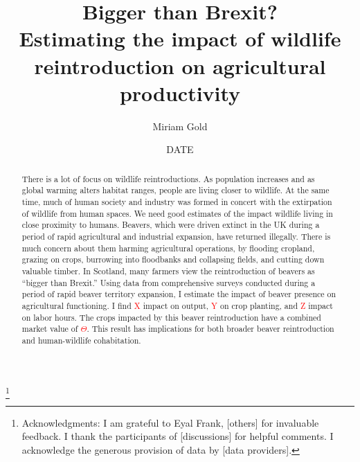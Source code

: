 \documentclass[11pt, english, letterpaper]{article}
\begin{document}
\justifying

\title{Bigger than Brexit? \\ Estimating the impact of wildlife reintroduction on agricultural productivity} \thanks{Acknowledgments: I am grateful to Eyal Frank, [others] for invaluable feedback. I thank the participants of [discussions] for helpful comments. I acknowledge the generous provision of data by [data providers].}

\author[1]{\small Miriam Gold}

\date{DATE}
\maketitle


\begin{abstract}
    \singlespacing 
    There is a lot of focus on wildlife reintroductions. As population increases and as global warming alters habitat ranges, people are living closer to wildlife. At the same time, much of human society and industry was formed in concert with the extirpation of wildlife from human spaces. We need good estimates of the impact wildlife living in close proximity to humans. Beavers, which were driven extinct in the UK during a period of rapid agricultural and industrial expansion, have returned illegally. There is much concern about them harming agricultural operations, by flooding cropland, grazing on crops, burrowing into floodbanks and collapsing fields, and cutting down valuable timber. In Scotland, many farmers view the reintroduction of beavers as ``bigger than Brexit.'' Using data from comprehensive surveys conducted during a period of rapid beaver territory expansion, I estimate the impact of beaver presence on agricultural functioning. I find \textcolor{red}{X} impact on output, \textcolor{red}{Y} on crop planting, and \textcolor{red}{Z} impact on labor hours. The crops impacted by this beaver reintroduction have a combined market value of \textcolor{red}{$\Theta$}. This result has implications for both broader beaver reintroduction and human-wildlife cohabitation. 
\end{abstract}
\end{document}
